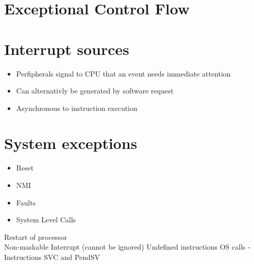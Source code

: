 \section{Exceptional Control Flow}

\section*{Interrupt sources}
\begin{itemize}
  \item Perfipherals signal to CPU that an event needs immediate attention
  \item Can alternativly be generated by software request
  \item Asynchronous to instruction execution
\end{itemize}

\section*{System exceptions}
\begin{itemize}
  \item Reset
  \item NMI
  \item Faults
  \item System Level Calls
\end{itemize}

Restart of processor\\
Non-maskable Interrupt (cannot be ignored) Undefined instructions OS calls - Instructions SVC and PendSV

